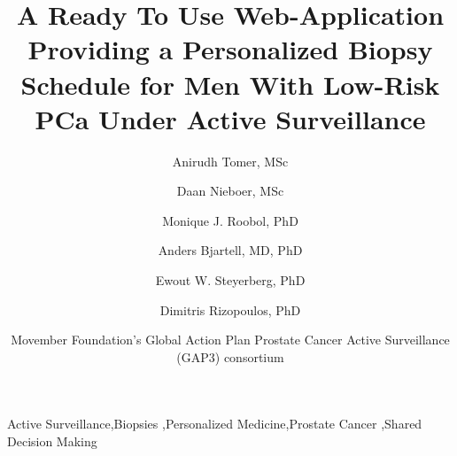 \documentclass[review, 12pt]{elsarticle}
\begin{document}
\begin{frontmatter}

\title{A Ready To Use Web-Application Providing a Personalized Biopsy Schedule for Men With Low-Risk PCa Under Active Surveillance}

\author[1]{Anirudh Tomer, MSc} 

\author[2]{Daan Nieboer, MSc}

\author[3]{Monique J. Roobol, PhD}

\author[4]{Anders Bjartell, MD, PhD}

\author[2,5]{Ewout W. Steyerberg, PhD}

\author[1]{Dimitris Rizopoulos, PhD}

\author[6]{Movember Foundation’s Global Action Plan Prostate Cancer Active Surveillance (GAP3) consortium}

\address[1]{Department of Biostatistics, Erasmus University Medical Center, Rotterdam, the Netherlands}
\address[2]{Department of Public Health, Erasmus University Medical Center, Rotterdam, the Netherlands}
\address[3]{Department of Urology, Erasmus University Medical Center, Rotterdam, the Netherlands}
\address[4]{Department of Urology, Sk\r{a}ne University Hospital, Malm\"{o}, Sweden}
\address[5]{Department of Biomedical Data Sciences, Leiden University Medical Center, Leiden, the Netherlands}
\address[6]{The Movember Foundation’s Global Action Plan Prostate Cancer Active Surveillance (GAP3) consortium members presented in Appendix A}




\begin{keyword}
Active Surveillance\sep Biopsies \sep Personalized Medicine\sep Prostate Cancer \sep Shared Decision Making
\end{keyword}

\end{frontmatter}

\linenumbers
\end{document}
